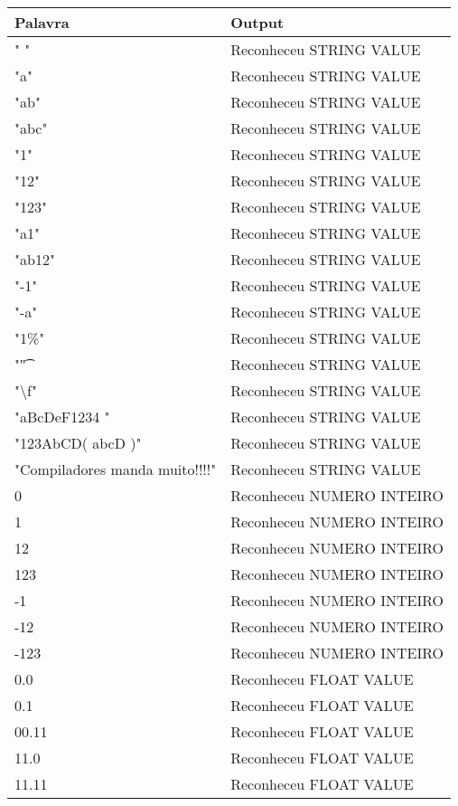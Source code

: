 \documentclass[
	article,			%
	11pt,				%
	oneside,			%
	a4paper,			%
	portuguese,			%
	brazil,				%
	sumario=tradicional
	]{abntex2}
\begin{document}
\begin{center}
\begin{table}[H]
\begin{tabularx}{1\textwidth}{p{5cm}|X}
Palavra & Output \\
\hline
" " & Reconheceu STRING VALUE \\
"a" & Reconheceu STRING VALUE \\
"ab" & Reconheceu STRING VALUE \\
"abc" & Reconheceu STRING VALUE \\
"1" & Reconheceu STRING VALUE \\
"12" & Reconheceu STRING VALUE \\
"123" & Reconheceu STRING VALUE \\
"a1" & Reconheceu STRING VALUE \\
"ab12" & Reconheceu STRING VALUE \\
"-1" & Reconheceu STRING VALUE \\
"-a" & Reconheceu STRING VALUE \\
"1\%" & Reconheceu STRING VALUE \\
"\t" & Reconheceu STRING VALUE \\
"\textbackslash f" &Reconheceu STRING VALUE \\
"aBcDeF1234 " & Reconheceu STRING VALUE \\
"123AbCD( abcD )" & Reconheceu STRING VALUE \\
"Compiladores manda muito!!!!" & Reconheceu STRING VALUE \\
0 & Reconheceu NUMERO INTEIRO \\
1 & Reconheceu NUMERO INTEIRO \\ 
12 & Reconheceu NUMERO INTEIRO \\
123 & Reconheceu NUMERO INTEIRO \\ 
-1 & Reconheceu NUMERO INTEIRO \\
-12 & Reconheceu NUMERO INTEIRO \\
-123 & Reconheceu NUMERO INTEIRO \\
0.0 & Reconheceu FLOAT VALUE \\
0.1 & Reconheceu FLOAT VALUE \\
00.11 & Reconheceu FLOAT VALUE \\
11.0 & Reconheceu FLOAT VALUE \\
11.11 & Reconheceu FLOAT VALUE \\ \hline
\end{tabularx}
\end{table}


\end{center}
\end{document}
